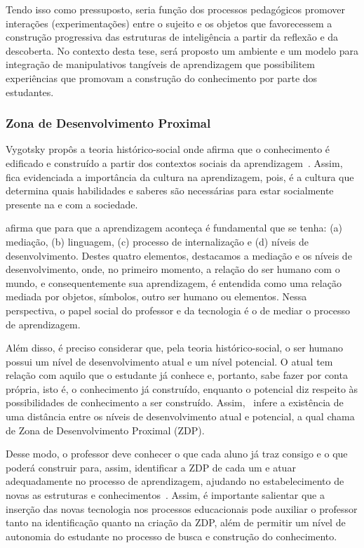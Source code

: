 Tendo isso como pressuposto, seria função dos processos pedagógicos promover interações (experimentações) entre o sujeito e os objetos que favorecessem a construção progressiva das estruturas de inteligência a partir da reflexão e da descoberta. No contexto desta tese, será proposto um ambiente e um modelo para integração de manipulativos tangíveis de aprendizagem que possibilitem experiências que promovam a construção do conhecimento por parte dos estudantes.

\subsubsection{Zona de Desenvolvimento Proximal}
Vygotsky propôs a teoria histórico-social onde afirma que o conhecimento é edificado e construído a partir dos contextos sociais da aprendizagem~\citep{Vygotsky:1998}. Assim, fica evidenciada a importância da cultura na aprendizagem, pois, é a cultura que determina quais habilidades e saberes são necessárias para estar socialmente presente na e com a sociedade.

\cite{Rego:2013} afirma que para que a aprendizagem aconteça é fundamental que se tenha: (a) mediação, (b) linguagem, (c) processo de internalização e (d) níveis de desenvolvimento. Destes quatro elementos, destacamos a mediação e os níveis de desenvolvimento, onde, no primeiro momento, a relação do ser humano com o mundo, e consequentemente sua aprendizagem, é entendida como uma relação mediada por objetos, símbolos, outro ser humano ou elementos. Nessa perspectiva, o papel social do professor e da tecnologia é o de mediar o processo de aprendizagem.

Além disso, é preciso considerar que, pela teoria histórico-social, o ser humano possui um nível de desenvolvimento atual e um nível potencial. O atual tem relação com aquilo que o estudante já conhece e, portanto, sabe fazer por conta própria, isto é, o conhecimento já construído, enquanto o potencial diz respeito às possibilidades de conhecimento a ser construído. Assim,~\cite{Vygotsky:1998} infere a existência de uma distância entre os níveis de desenvolvimento atual e potencial, a qual chama de Zona de Desenvolvimento Proximal (ZDP). %

Desse modo, o professor deve conhecer o que cada aluno já traz consigo e o que poderá construir para, assim, identificar a ZDP de cada um e atuar adequadamente no processo de aprendizagem, ajudando no estabelecimento de novas as estruturas e conhecimentos~\cite{Almeida:2000}. Assim, é importante salientar que a inserção das novas tecnologia nos processos educacionais pode auxiliar o professor tanto na identificação quanto na criação da ZDP, além de permitir um nível de autonomia do estudante no processo de busca e construção do conhecimento.

